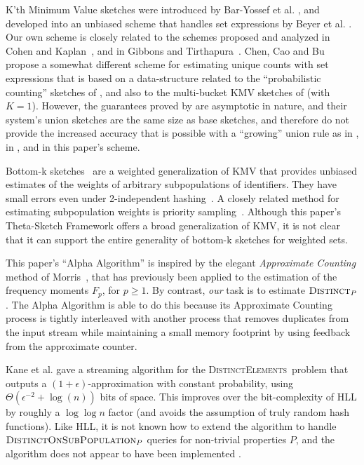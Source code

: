 \documentclass{article}
\newcommand{\distinctsub}{\textsc{DistinctOnSubPopulation}}
\newcommand{\distinct}{\textsc{Distinct}}
\newcommand{\DistinctElements}{\textsc{DistinctElements}}
\begin{document}
K'th Minimum Value sketches were introduced by Bar-Yossef et al. \cite{bar2002counting}, and developed into
an unbiased scheme that handles set expressions by Beyer et al. \cite{beyer2009distinct}.
Our own scheme is closely related to the schemes
proposed and analyzed in Cohen and Kaplan~\cite{cohen2009leveraging}, 
and in Gibbons and Tirthapura~\cite{gibbons2001estimating}.
Chen, Cao and Bu~\cite{chen2007simple} propose a somewhat different
scheme for estimating unique counts with set expressions
that is based on a data-structure related to the ``probabilistic counting'' sketches of \cite{flajolet1985probabilistic},
and also to the multi-bucket KMV sketches of \cite{giroire2009order} (with $K=1$).
However, the guarantees proved by \cite{chen2007simple} are asymptotic in nature,
and their system's union sketches are the same size as base sketches, and therefore do not provide the increased
accuracy that is possible with a ``growing'' union rule as in \cite{cohen2009leveraging}, in \cite{gibbons2001estimating},
and in this paper's scheme.

Bottom-k sketches~\cite{cohen2007summarizing,cohen2009leveraging} are a weighted generalization
of KMV that provides unbiased estimates of the weights of arbitrary subpopulations of identifiers.
They have small errors even under 2-independent hashing~\cite{thorup2013bottomk}. A closely 
related method for estimating subpopulation weights is priority sampling~\cite{DuffieldLT07}.
Although this paper's Theta-Sketch Framework offers a broad generalization of KMV, 
it is not clear that it can support the entire generality of bottom-k sketches for weighted sets. 



This paper's ``Alpha Algorithm'' is inspired by the elegant {\em Approximate Counting} 
method of Morris~\cite{morris1978counting}, that has previously been
applied to the estimation of the frequency moments $F_p$, for $p \ge 1$. 
By contrast, {\em our} task is to estimate $\distinct_P$. The Alpha Algorithm is
able to do this because its Approximate Counting process is tightly
interleaved with another process that removes duplicates from the
input stream while maintaining a small memory footprint by using
feedback from the approximate counter.

Kane et al. \cite{kane2010optimal} gave a streaming algorithm for the \DistinctElements\ problem
that outputs a $(1+\epsilon)$-approximation with constant probability, using
$\Theta(\epsilon^{-2} + \log(n))$ bits of space. 
This improves over the bit-complexity of HLL by roughly a $\log\log n$ factor (and avoids the assumption of truly random hash functions). 
Like HLL, it is not known how to extend the algorithm to handle $\distinctsub_P$ queries for non-trivial properties $P$, and the algorithm does not appear to 
have been implemented \cite{heule2013hll}. 
\end{document}
